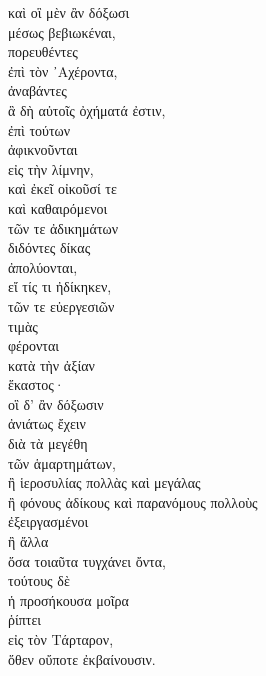 {\large
\begin{greek}
\noindent καὶ οἳ μὲν ἂν δόξωσι \\
\tabto{2em} μέσως βεβιωκέναι, \\
πορευθέντες \\
\tabto{2em} ἐπὶ τὸν ᾿Αχέροντα, \\
ἀναβάντες \\
\tabto{2em} ἃ δὴ αὐτοῖς ὀχήματά ἐστιν, \\
ἐπὶ τούτων \\
ἀφικνοῦνται \\
\tabto{2em} εἰς τὴν λίμνην, \\
καὶ ἐκεῖ οἰκοῦσί τε \\
καὶ καθαιρόμενοι \\
\tabto{2em} τῶν τε ἀδικημάτων \\
\tabto{2em} διδόντες δίκας \\
\tabto{2em} ἀπολύονται, \\
\tabto{4em} εἴ τίς τι ἠδίκηκεν, \\
\tabto{2em} τῶν τε εὐεργεσιῶν \\
\tabto{2em} τιμὰς \\
\tabto{2em} φέρονται \\
\tabto{4em} κατὰ τὴν ἀξίαν \\
\tabto{2em} ἕκαστος·\\
οἳ δ' ἂν δόξωσιν \\
\tabto{2em} ἀνιάτως ἔχειν \\

\tabto{2em} διὰ τὰ μεγέθη \\
\tabto{4em} τῶν ἁμαρτημάτων, \\
\tabto{2em} ἢ ἱεροσυλίας πολλὰς καὶ μεγάλας \\
\tabto{2em} ἢ φόνους ἀδίκους καὶ παρανόμους πολλοὺς \\
\tabto{2em} ἐξειργασμένοι \\
\tabto{2em} ἢ ἄλλα \\
\tabto{4em} ὅσα τοιαῦτα τυγχάνει ὄντα,\\
τούτους δὲ \\
ἡ προσήκουσα μοῖρα \\
ῥίπτει \\
\tabto{2em} εἰς τὸν Τάρταρον,\\
\tabto{4em} ὅθεν οὔποτε ἐκβαίνουσιν. \\

\end{greek}
}

